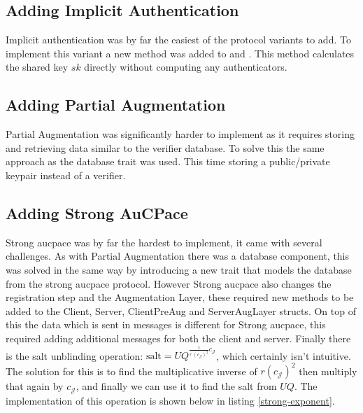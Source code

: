 \subsection{Adding Implicit Authentication}
Implicit authentication was by far the easiest of the protocol variants to add.
To implement this variant a new method  was added to  and .
This method calculates the shared key $sk$ directly without computing any authenticators.

\subsection{Adding Partial Augmentation}
Partial Augmentation was significantly harder to implement as it requires storing and retrieving data similar to the verifier database.
To solve this the same approach as the database trait was used.
This time storing a public/private keypair instead of a verifier.

\subsection{Adding Strong AuCPace}
Strong \gls{aucpace} was by far the hardest to implement, it came with several challenges.
As with Partial Augmentation there was a database component, this was solved in the same way by introducing a new trait that models the database from the strong \gls{aucpace} protocol.
However Strong \gls{aucpace} also changes the registration step and the Augmentation Layer, these required new methods to be added to the Client, Server, ClientPreAug and ServerAugLayer structs.
On top of this the data which is sent in messages is different for Strong \gls{aucpace}, this required adding additional messages for both the client and server.
Finally there is the salt unblinding operation: $\text{salt} = UQ^{\frac{1}{r\ (c_{\mathcal{J}})^2} c_{\mathcal{J}}}$, which certainly isn't intuitive.
The solution for this is to find the multiplicative inverse of $r (c_{\mathcal{J}})^2$ then multiply that again by $c_{\mathcal{J}}$, and finally we can use it to find the salt from $UQ$.
The implementation of this operation is shown below in listing \ref{strong-exponent}.


